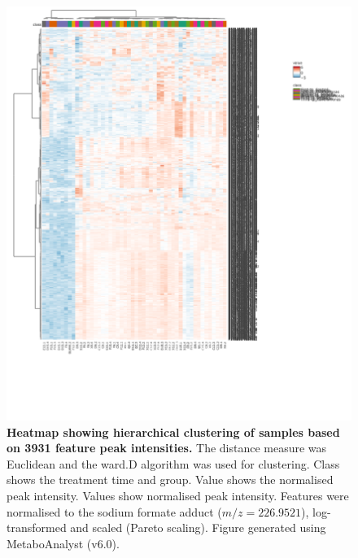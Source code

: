 \begin{figure}[htp!]
    \centering
    \includegraphics[width=\textwidth]{Figures/AllFeaturesAllSamples_Clustered.png}
    \caption[Heatmap showing hierarchical clustering of samples based on feature peak intensities.]{\textbf{Heatmap showing hierarchical clustering of samples based on 3931 feature peak intensities.} The distance measure was Euclidean and the ward.D algorithm was used for clustering. Class shows the treatment time and group. Value shows the normalised peak intensity. Values show normalised peak intensity. Features were normalised to the sodium formate  adduct ($m/z=226.9521$), log-transformed and scaled (Pareto scaling). Figure generated using MetaboAnalyst (v6.0).}
    \label{fig:AllFeaturesAllSamples}
\end{figure}




